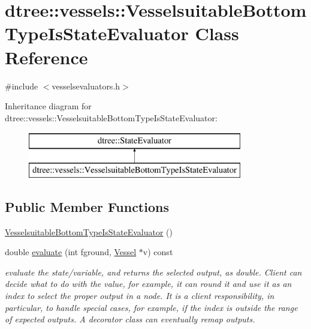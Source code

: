 \hypertarget{classdtree_1_1vessels_1_1_vesselsuitable_bottom_type_is_state_evaluator}{}\section{dtree\+::vessels\+::Vesselsuitable\+Bottom\+Type\+Is\+State\+Evaluator Class Reference}
\label{classdtree_1_1vessels_1_1_vesselsuitable_bottom_type_is_state_evaluator}


{\ttfamily \#include $<$vesselsevaluators.\+h$>$}

Inheritance diagram for dtree\+::vessels\+::Vesselsuitable\+Bottom\+Type\+Is\+State\+Evaluator\+:\begin{figure}[H]
\begin{center}
\leavevmode
\includegraphics[height=2.000000cm]{d6/d4d/classdtree_1_1vessels_1_1_vesselsuitable_bottom_type_is_state_evaluator}
\end{center}
\end{figure}
\subsection*{Public Member Functions}
\begin{DoxyCompactItemize}
\item 
\mbox{\hyperlink{classdtree_1_1vessels_1_1_vesselsuitable_bottom_type_is_state_evaluator_af9c2f30f5fdaa9457d034cc3868298b1}{Vesselsuitable\+Bottom\+Type\+Is\+State\+Evaluator}} ()
\item 
double \mbox{\hyperlink{classdtree_1_1vessels_1_1_vesselsuitable_bottom_type_is_state_evaluator_ac002cecd3e2814b923a2e990c73cb0c9}{evaluate}} (int fground, \mbox{\hyperlink{class_vessel}{Vessel}} $\ast$v) const
\begin{DoxyCompactList}\small\item\em evaluate the state/variable, and returns the selected output, as double. Client can decide what to do with the value, for example, it can round it and use it as an index to select the proper output in a node. It is a client responsibility, in particular, to handle special cases, for example, if the index is outside the range of expected outputs. A decorator class can eventually remap outputs. \end{DoxyCompactList}\end{DoxyCompactItemize}


